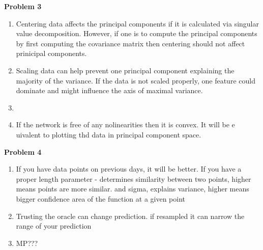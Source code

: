 \documentclass[11pt,letterpaper]{article}
\begin{document}
\textbf{Problem 3}
\begin{enumerate}[labelindent=0pt]
\item 
Centering data affects the principal components if it is calculated via singular
value decomposition.  However, if one is to compute the principal components by
first computing the covariance matrix then centering should not affect
prinicipal components.

\item 
Scaling data can help prevent one principal component explaining the majority of
the variance.  If the data is not scaled properly, one feature could dominate
and might influence the axis of maximal variance. 

\item 
\item 
If the network is free of any nolinearities then it is convex.  
It will be e	uivalent to plotting thd data in principal component space.
\end{enumerate}

\textbf{Problem 4}
\begin{enumerate}[labelindent=0pt]
\item 
If you have data points on previous days, it will be better.  If you have a
proper length parameter - determines similarity between two points, higher means
points are more similar.  and sigma, explains variance, higher means bigger
confidence area of the function at a given point
\item 
Trusting the oracle can change prediction. if resampled it can narrow the range
of your prediction
\item 
MP???
\end{enumerate}


\noindent
\end{document}
